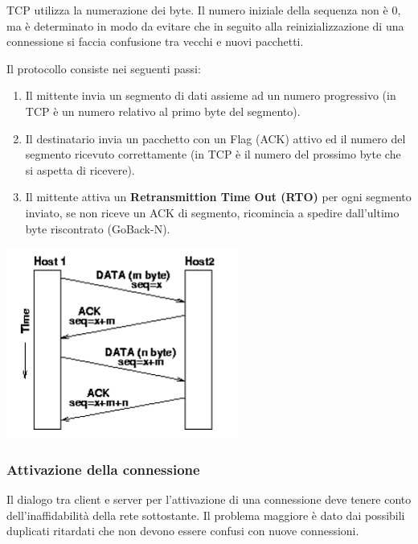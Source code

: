             TCP utilizza la numerazione dei byte. Il numero iniziale della sequenza non è 0, ma è determinato in modo da evitare che in seguito alla reinizializzazione di una connessione si faccia confusione tra vecchi e nuovi pacchetti.
        
            Il protocollo consiste nei seguenti passi:
            \begin{enumerate}
                \item Il mittente invia un segmento di dati assieme ad un numero progressivo (in TCP è un numero relativo al primo byte del segmento).
                \item Il destinatario invia un pacchetto con un Flag (ACK) attivo ed il numero del segmento ricevuto correttamente (in TCP è il numero del prossimo byte che si aspetta di ricevere).
                \item Il mittente attiva un \textbf{Retransmittion Time Out (RTO)} per ogni segmento inviato, se non riceve un ACK di segmento, ricomincia a spedire dall'ultimo byte riscontrato (GoBack-N).
            \end{enumerate}

            \begin{center}
                \includegraphics[scale=0.55]{chapters/5/assets/schema_g.png}
            \end{center}

        \subsubsection{Attivazione della connessione}
            Il dialogo tra client e server per l'attivazione di una connessione deve tenere conto dell'inaffidabilità della rete sottostante. Il problema maggiore è dato dai possibili duplicati ritardati che non devono essere confusi con nuove connessioni.
        
